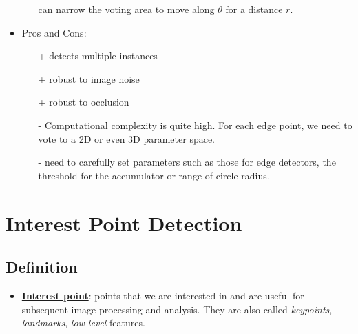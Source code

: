 \documentclass[twocolumn,landscape,10pt]{article}
\theoremstyle{definition}
\begin{document}
\begin{itemize}
\begin{itemize}
                can narrow the voting area to move along $\theta$ for a distance
                $r$.
        \end{itemize} 
    \item Pros and Cons:
        \begin{itemize}
            \item[+] detects multiple instances
            \item[+] robust to image noise
            \item[+] robust to occlusion
            \item[-] Computational complexity is quite high. For each edge
                point, we need to vote to a 2D or even 3D parameter space.
            \item[-] need to carefully set parameters such as those for edge
                detectors, the threshold for the accumulator or range of circle
                radius.
        \end{itemize} 
\end{itemize} 


\section{Interest Point Detection}

\subsection{Definition}

\begin{itemize}
    \item \underline{\textbf{Interest point}}: points that we are interested in
        and are useful for subsequent image processing and analysis.
        They are also called \emph{keypoints}, \emph{landmarks},
        \emph{low-level} features.
\end{itemize} 
\end{document}

